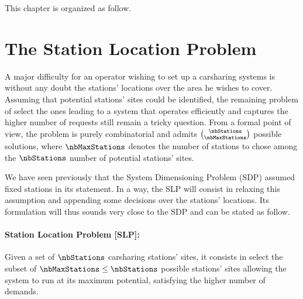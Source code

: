 \begin{bibunit}[ieeetr]
\bigskip
This chapter is organized as follow.


\section{The Station Location Problem}
A major difficulty for an operator wishing to set up a carsharing systems is without any doubt the stations' locations over the area he wishes to cover.
Assuming that potential stations' sites could be identified, the remaining problem of select the ones leading to a system that operates efficiently and captures the higher number of requests still remain a tricky question.
From a formal point of view, the problem is purely combinatorial and admits $\binom{\nbStations}{\nbMaxStations}$ possible solutions, where $\nbMaxStations$ denotes the number of stations to chose among the $\nbStations$ number of potential stations' sites.\medbreak

We have seen previously that the System Dimensioning Problem (SDP) assumed fixed stations in its statement.
In a way, the SLP will consist in relaxing this assumption and appending some decisions over the stations' locations.
Its formulation will thus sounds very close to the SDP and can be stated as follow.

\paragraph{Station Location Problem [SLP]:}
Given a set of $\nbStations$ carsharing stations' sites, it consists in select the subset of $\nbMaxStations \leq \nbStations$ possible stations' sites allowing the system to run at its maximum potential, \ie satisfying the higher number of demands. 


\end{bibunit}
